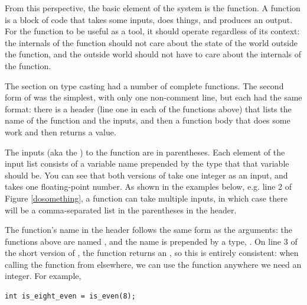 From this perspective, the basic element of the system is the function.
A function is a block of code that takes some inputs, does things,
and produces an output. For the function to be useful as a tool, it
should operate regardless of its context: the internals of the function
should not care about the state of the world outside the function, and
the outside world should not have to care about the internals of the
function.

The section on type casting had a number of complete functions. The
second form of  was the simplest, with only one 
non-comment line, but each had the same format: there is a header (line
one in each of the functions above) that lists the name of the function
and the inputs, and then a function body that does some work and then
returns a value.

The inputs (aka the ) to the function
are in parentheses. Each element of the input
list consists of a variable name prepended by the type that that
variable should be. You can see that both versions of 
take one integer as an input, and
 takes one floating-point number.
As shown in the examples below, e.g. line 2 of Figure \ref{dosomething}, a
function can take multiple inputs, in which case there will be a
comma-separated list in the parentheses in the header.

The function's name in the header follows the same form as the arguments:
the functions above are named , and the name is prepended by a type,
.  On line 3 of the short version of , the function returns
an , so this is entirely consistent: when calling the
function from elsewhere, we can use the function anywhere we need an
integer. For example,
\begin{lstlisting}
int is_eight_even = is_even(8);
\end{lstlisting}




